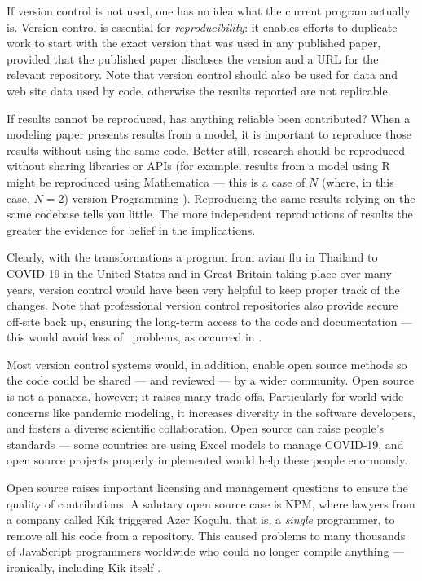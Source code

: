\documentclass{article}
\begin{document}
If version control is not used, one has no idea what the current program actually is. {Version control is essential for \emph{reproducibility\/}: \cite{basic-reproducibilty,reproducibility} it enables efforts to duplicate work to start with the exact version that was used in any published paper, provided that the published paper discloses the version and a URL for the relevant repository. Note that version control should also be used for data and web site data used by code, otherwise the results reported are not replicable.}

{If results cannot be reproduced, has anything reliable been contributed? When a modeling paper presents results from a model, it is important to reproduce those results without using the same code. Better still, research should be reproduced without sharing libraries or APIs (for example, results from a model using R might be reproduced using Mathematica --- this is a case of $N$ (where, in this case, $N=2$) version Programming \cite{NVP}). Reproducing the same results relying on the same codebase tells you little. The more independent reproductions of results the greater the evidence for belief in the implications.}

Clearly, with the transformations a program from avian flu in Thailand \cite{avianFluModel} to COVID-19 in the United States and in Great Britain \cite{ICmodel} taking place over many years, version control would have been very helpful to keep proper track of the changes. Note that professional version control repositories also provide secure off-site back up, ensuring the long-term access to the code and documentation --- this would avoid loss of \supplement\ problems, as occurred in \cite{flu-model}.

Most version control systems would, in addition, enable open source methods so the code could be shared --- and reviewed --- by a wider community. Open source is not a panacea, however; it raises many trade-offs. Particularly for world-wide concerns like pandemic modeling, it increases diversity in the software developers, and fosters a diverse scientific collaboration. Open source can raise people's standards --- some countries \cite{excel1,excel2} are using Excel models to manage COVID-19, and open source projects properly implemented would help these people enormously. 

Open source raises important licensing and management questions to ensure the quality of contributions. A salutary open source case is NPM, where lawyers from a company called Kik triggered Azer Ko\c{c}ulu, that is, a \emph{single\/} programmer, to remove all his code from a repository. This caused problems to many thousands of JavaScript programmers worldwide who could no longer compile anything --- ironically, including Kik itself \cite{npm}. 
\end{document}
